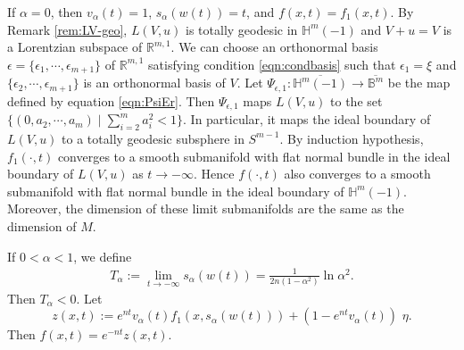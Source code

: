 \documentclass[12pt]{article}
\begin{document}
If $\alpha=0$, then $v_{\alpha}(t)=1$,  $s_{\alpha}(w(t))=t$, and $f(x, t) = f_1(x, t)$. By Remark \ref{rem:LV-geo},
$L(V, u)$ is totally geodesic in $\mathbb{H}^m(-1)$ and $V+u=V$ is a Lorentzian subspace of $\mathbb{R}^{m,1}$.
We can choose
an orthonormal basis $\epsilon=\{\epsilon_1, \cdots, \epsilon_{m+1}\}$ of $\mathbb{R}^{m,1}$ satisfying
condition \eqref{eqn:condbasis} such that
$\epsilon_1 = \xi$ and $\{\epsilon_2, \cdots, \epsilon_{m+1}\}$ is an orthonormal basis of $V$.
Let $\Psi_{\epsilon,1}: \overline{\mathbb{H}^m(-1)} \longrightarrow \overline{\mathbb{B}^m}$ be the map defined by
equation \eqref{eqn:PsiEr}. Then $\Psi_{\epsilon,1}$ maps $L(V,u)$ to the set
$\{(0, a_2, \cdots, a_m) \mid \sum_{i=2}^m a_{i}^2 < 1\}$. In particular, it maps
the ideal boundary of $L(V,u)$ to a totally geodesic subsphere in $S^{m-1}$.
By induction hypothesis, $f_1(\cdot, t)$ converges to a smooth submanifold with flat normal bundle
in the ideal boundary of $L(V,u)$ as $t \rightarrow -\infty$.
Hence $f(\cdot, t)$ also converges to a smooth submanifold with flat normal bundle
in the ideal boundary of $\mathbb{H}^m(-1)$. Moreover, the dimension of these limit submanifolds are the same
as the dimension of $M$.

If $0<\alpha<1 $, we define
\begin{align*}
	T_\alpha:= \lim_{t \rightarrow -\infty} s_\alpha(w(t)) =
		\frac{1}{2n(1-\alpha^2)}\ln\alpha^2.
\end{align*}
Then $T_\alpha <0$.
Let
\[ z(x, t) := e^{nt} v_\alpha(t) f_1(x, s_{\alpha}(w(t)))
		  	      +(1-e^{nt} v_\alpha(t)) \,\, \eta.\]
Then $f(x, t) = e^{-nt} z(x, t)$.
\end{document}
